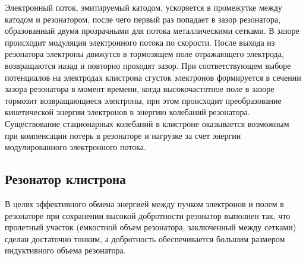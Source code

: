 \documentclass[a4paper,14pt]{extarticle}
\begin{document}
Электронный поток, эмитируемый катодом, ускоряется в промежутке между катодом и резонатором, после чего первый раз попадает в зазор резонатора, образованный двумя прозрачными для потока металлическими сетками. В зазоре происходит модуляция электронного потока по скорости. После выхода из резонатора электроны движутся в тормозящем поле отражающего электрода, возвращаются назад и повторно проходят зазор. При соответствующем выборе потенциалов на электродах клистрона сгусток электронов формируется в сечении зазора резонатора в момент времени, когда высокочастотное поле в зазоре тормозит возвращающиеся электроны, при этом происходит преобразование кинетической энергии электронов в энергию колебаний резонатора. Существование стационарных колебаний в клистроне оказывается возможным при компенсации потерь в резонаторе и нагрузке за счет энергии модулированного электронного потока.

\subsection{Резонатор клистрона}

В целях эффективного обмена энергией между пучком электронов и полем в резонаторе при сохранении высокой добротности резонатор выполнен так, что пролетный участок (емкостной объем резонатора, заключенный между сетками) сделан достаточно тонким\footnotemark, а добротность обеспечивается большим размером индуктивного объема резонатора.

\end{document}

